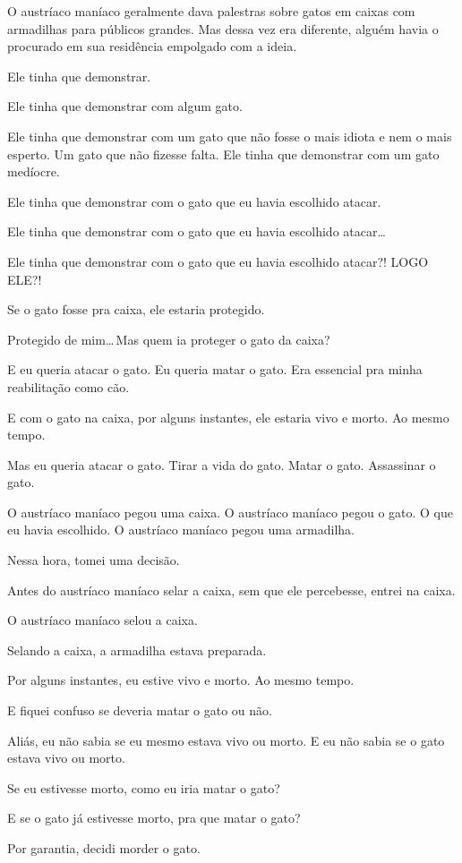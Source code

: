 O austríaco maníaco geralmente dava palestras sobre gatos em caixas com armadilhas para públicos grandes. Mas dessa vez era diferente, alguém havia o procurado em sua residência empolgado com a ideia.

Ele tinha que demonstrar.

Ele tinha que demonstrar com algum gato.

Ele tinha que demonstrar com um gato que não fosse o mais idiota e nem o mais esperto. Um gato que não fizesse falta. Ele tinha que demonstrar com um gato medíocre.

Ele tinha que demonstrar com o gato que eu havia escolhido atacar.

Ele tinha que demonstrar com o gato que eu havia escolhido atacar\ldots

Ele tinha que demonstrar com o gato que eu havia escolhido atacar?! LOGO ELE?!

Se o gato fosse pra caixa, ele estaria protegido.

Protegido de mim\ldots\,Mas quem ia proteger o gato da caixa?

E eu queria atacar o gato. Eu queria matar o gato. Era essencial pra minha reabilitação como cão.

E com o gato na caixa, por alguns instantes, ele estaria vivo e morto. Ao mesmo tempo.

Mas eu queria atacar o gato. Tirar a vida do gato. Matar o gato. Assassinar o gato.

O austríaco maníaco pegou uma caixa. O austríaco maníaco pegou o gato. O que eu havia escolhido. O austríaco maníaco pegou uma armadilha.

Nessa hora, tomei uma decisão.

Antes do austríaco maníaco selar a caixa, sem que ele percebesse, entrei na caixa.

O austríaco maníaco selou a caixa.

Selando a caixa, a armadilha estava preparada.

Por alguns instantes, eu estive vivo e morto. Ao mesmo tempo.

E fiquei confuso se deveria matar o gato ou não.

Aliás, eu não sabia se eu mesmo estava vivo ou morto. E eu não sabia se o gato estava vivo ou morto.

Se eu estivesse morto, como eu iria matar o gato?

E se o gato já estivesse morto, pra que matar o gato?

Por garantia, decidi morder o gato.

